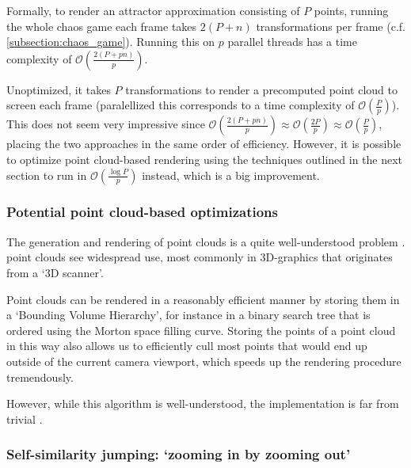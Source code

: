 \documentclass[11pt]{article}
\begin{document}
Formally, to render an attractor approximation consisting of \(P\) points, 
running the whole chaos game each frame takes \(2(P+n)\) transformations per frame (c.f. \autoref{subsection:chaos_game}). 
Running this on \(p\) parallel threads has a time complexity of \(\mathcal{O}(\frac{2(P+pn)}{p})\).

Unoptimized, it takes \(P\) transformations to render a precomputed point cloud to screen each frame 
(paralellized this corresponds to a time complexity of \(\mathcal{O}(\frac{P}{p})\)).
This does not seem very impressive since \(\mathcal{O}(\frac{2(P+pn)}{p}) \approx \mathcal{O}(\frac{2P}{p}) \approx \mathcal{O}(\frac{P}{p})\),
placing the two approaches in the same order of efficiency. However, it is possible to optimize point cloud-based rendering using the techniques outlined in the next section
to run in \(\mathcal{O}(\frac{\log{P}}{p})\) instead, which is a big improvement.

\subsubsection{Potential point cloud-based optimizations}
\label{sec:orga5b617f}
\label{subsection:point_cloud_optimizations}

The generation and rendering of point clouds is a quite well-understood problem \cite{wimmer2006instant}. point clouds see widespread use,
most commonly in 3D-graphics that originates from a `3D scanner'.

Point clouds can be rendered in a reasonably efficient manner by storing them in a `Bounding Volume Hierarchy',
for instance in a binary search tree that is ordered using the Morton space filling curve. \cite{lauterbach2009construction}
Storing the points of a point cloud in this way also allows us to efficiently cull most points that would end up outside of the current camera viewport,
which speeds up the rendering procedure tremendously.

However, while this algorithm is well-understood, the implementation is far from trivial \cite{lauterbach2009construction}.

\subsubsection{Self-similarity jumping: `zooming in by zooming out'}
\label{sec:org11b646a}
\label{subsection:self_similarity}
\end{document}
